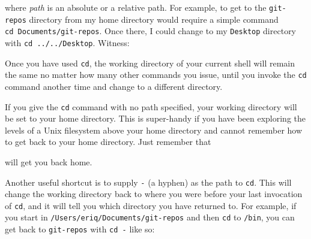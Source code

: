 \documentclass[]{krantz}
\makeatletter
\newenvironment{Shaded}{\begin{snugshade}}{\end{snugshade}}
\newcommand{\ExtensionTok}[1]{#1}
\newcommand{\NormalTok}[1]{#1}
\newenvironment{kframe}{%
\medskip{}
\setlength{\fboxsep}{.8em}
 \def\at@end@of@kframe{}%
 \ifinner\ifhmode%
  \def\at@end@of@kframe{\end{minipage}}%
  \begin{minipage}{\columnwidth}%
 \fi\fi%
 \def\FrameCommand##1{\hskip\@totalleftmargin \hskip-\fboxsep
 \colorbox{shadecolor}{##1}\hskip-\fboxsep
     \hskip-\linewidth \hskip-\@totalleftmargin \hskip\columnwidth}%
 \MakeFramed {\advance\hsize-\width
   \@totalleftmargin\z@ \linewidth\hsize
   \@setminipage}}%
 {\par\unskip\endMakeFramed%
 \at@end@of@kframe}
\renewenvironment{Shaded}{\begin{kframe}}{\end{kframe}}
\makeatother
\begin{document}
where \emph{path} is an absolute or a relative path. For example, to
get to the \texttt{git-repos} directory from my home directory would require
a simple command \texttt{cd\ Documents/git-repos}. Once there, I could change to
my \texttt{Desktop} directory with \texttt{cd\ ../../Desktop}. Witness:

\begin{Shaded}
\end{Shaded}

Once you have used \texttt{cd}, the working directory of your current shell will
remain the same no matter how many other commands you issue,
until you invoke the \texttt{cd} command another time and change
to a different directory.

If you give the \texttt{cd} command with no path specified, your working directory
will be set to your home directory. This is super-handy if you have been
exploring the levels of a Unix filesystem above your home directory and cannot
remember how to get back to your home directory. Just remember that

\begin{Shaded}
\begin{Highlighting}[]
\ExtensionTok{%
\end{Highlighting}
\end{Shaded}

will get you back home.

Another useful shortcut is to supply \texttt{-} (a hyphen) as the path to \texttt{cd}. This will
change the working directory back to where you were before your last invocation
of \texttt{cd}, and it will tell you which directory you have returned to. For example, if you start in \texttt{/Users/eriq/Documents/git-repos} and then
\texttt{cd} to \texttt{/bin}, you can get back to \texttt{git-repos} with \texttt{cd\ -} like so:

\begin{Shaded}
\end{Shaded}
\end{document}
